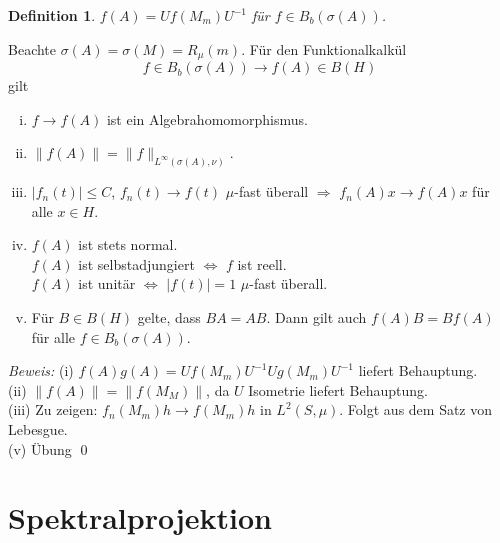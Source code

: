 \documentclass[12pt]{extreport} %
\newtheorem{Definition}[Satz]{Definition}
\numberwithin{equation}{section}
\newcommand{\Bew}{\emph{Beweis: }}
\begin{document}
	\begin{Definition}
		$f(A) = Uf(M_m)U^{-1}$ für $f\in B_b(\sigma(A))$.
	\end{Definition}
	
	Beachte $\sigma(A) = \sigma(M) = R_\mu(m)$. Für den Funktionalkalkül
	$$f\in B_b(\sigma(A))\rightarrow f(A) \in B(H)$$
	gilt
	\begin{enumerate}[(i)]
		\item $f\rightarrow f(A)$ ist ein Algebrahomomorphismus.
		\item $\|f(A)\| = \|f\|_{L^\infty(\sigma(A),\nu)}$.
		\item $|f_n(t)|\leq C$, $f_n(t)\rightarrow f(t)$ $\mu$-fast überall $\Rightarrow$ $f_n(A)x\rightarrow f(A)x$ für alle $x\in H$.
		\item $f(A)$ ist stets normal.\\
		$f(A)$ ist selbstadjungiert $\Leftrightarrow$ $f$ ist reell.\\
		$f(A)$ ist unitär $\Leftrightarrow$ $|f(t)| = 1$ $\mu$-fast überall.
		\item Für $B\in B(H)$ gelte, dass $BA = AB$. Dann gilt auch $f(A)B = Bf(A)$ für alle $f\in B_b(\sigma(A))$.
	\end{enumerate}
	 
	 \Bew (i) $f(A)g(A) = Uf(M_m)U^{-1} U g(M_m)U^{-1}$ liefert Behauptung.\\
	 (ii) $\|f(A)\| = \|f(M_M)\|$, da $U$ Isometrie liefert Behauptung.\\
	 (iii) Zu zeigen: $f_n(M_m) h\rightarrow f(M_m)h$ in $L^2(S,\mu)$. Folgt aus dem Satz von Lebesgue.\\
	 (v) Übung
	 \qed

	\section{Spektralprojektion}
	
\end{document}
